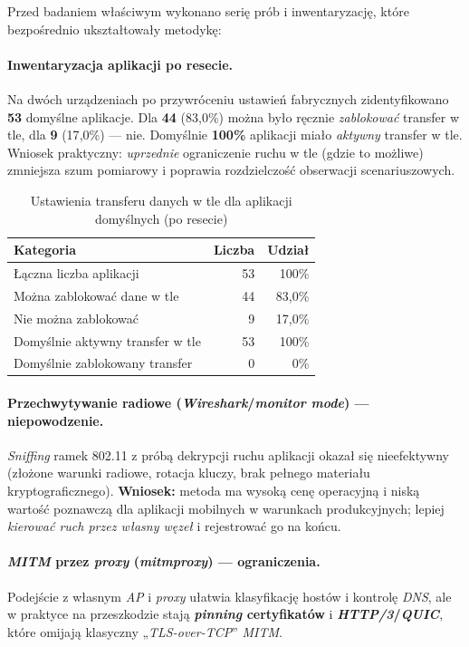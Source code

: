 Przed badaniem właściwym wykonano serię prób i inwentaryzację, które bezpośrednio ukształtowały metodykę:

\paragraph{Inwentaryzacja aplikacji po resecie.}
Na dwóch urządzeniach po przywróceniu ustawień fabrycznych zidentyfikowano \textbf{53} domyślne aplikacje. Dla \textbf{44} (83{,}0\%) można było ręcznie \emph{zablokować} transfer w tle, dla \textbf{9} (17{,}0\%) — nie. Domyślnie \textbf{100\%} aplikacji miało \emph{aktywny} transfer w tle. Wniosek praktyczny: \textit{uprzednie} ograniczenie ruchu w tle (gdzie to możliwe) zmniejsza szum pomiarowy i poprawia rozdzielczość obserwacji scenariuszowych.

\begin{table}[H]
  \centering
  \caption{Ustawienia transferu danych w tle dla aplikacji domyślnych (po resecie)}
  \label{tab:bg-data-baseline}
  \begin{tabular}{lrr}
    \toprule
    \textbf{Kategoria} & \textbf{Liczba} & \textbf{Udział} \\
    \midrule
    Łączna liczba aplikacji            & 53 & 100\% \\
    Można zablokować dane w tle        & 44 & 83{,}0\% \\
    Nie można zablokować               & 9  & 17{,}0\% \\
    Domyślnie aktywny transfer w tle   & 53 & 100\% \\
    Domyślnie zablokowany transfer     & 0  & 0\% \\
    \bottomrule
  \end{tabular}
\end{table}

\paragraph{Przechwytywanie radiowe (\emph{Wireshark}/\emph{monitor mode}) — niepowodzenie.}
\emph{Sniffing} ramek 802.11 z próbą dekrypcji ruchu aplikacji okazał się nieefektywny (złożone warunki radiowe, rotacja kluczy, brak pełnego materiału kryptograficznego). \textbf{Wniosek:} metoda ma wysoką cenę operacyjną i niską wartość poznawczą dla aplikacji mobilnych w warunkach produkcyjnych; lepiej \textit{kierować ruch przez własny węzeł} i rejestrować go na końcu.

\paragraph{\emph{MITM} przez \emph{proxy} (\emph{mitmproxy}) — ograniczenia.}
Podejście z własnym \emph{AP} i \emph{proxy} ułatwia klasyfikację hostów i kontrolę \emph{DNS}, ale w praktyce na przeszkodzie stają \textbf{\emph{pinning} certyfikatów} i \textbf{\emph{HTTP/3}/\emph{QUIC}}, które omijają klasyczny „\emph{TLS-over-TCP}” \emph{MITM}. 

